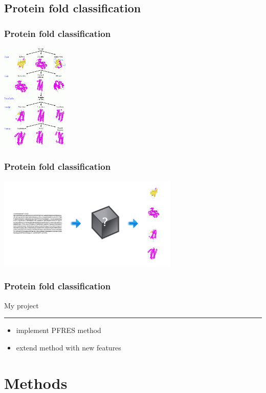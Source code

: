 \documentclass{beamer}
\begin{document}
\subsection{Protein fold classification}
\begin{frame}
  \frametitle{Protein fold classification}
  \begin{center}
    \includegraphics[width=125px]{scop-hier.png}
  \end{center}
\end{frame}
\begin{frame}
  \frametitle{Protein fold classification}
  \begin{center}
    \includegraphics[width=325px]{classification-simple.jpg}
  \end{center}
\end{frame}
\begin{frame}
  \frametitle{Protein fold classification}
  {\LARGE My project}
  \vspace{1px}
  \hrule
  \vspace{5px}
  \begin{itemize}
    \item implement PFRES method
    \item extend method with new features
  \end{itemize}
\end{frame}


\section{Methods}
\end{document}
